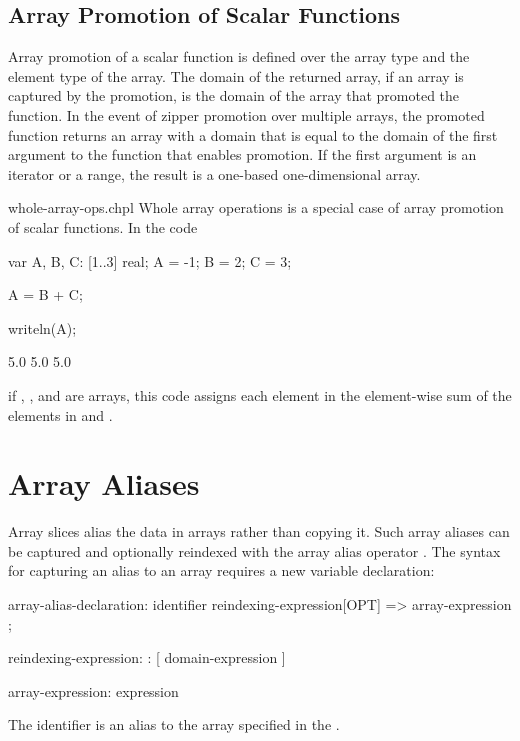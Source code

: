\subsection{Array Promotion of Scalar Functions}
\label{Array_Promotion_of_Scalar_Functions}

Array promotion of a scalar function is defined over the array type
and the element type of the array.  The domain of the returned array,
if an array is captured by the promotion, is the domain of the array
that promoted the function.  In the event of zipper promotion over
multiple arrays, the promoted function returns an array with a domain
that is equal to the domain of the first argument to the function that
enables promotion.  If the first argument is an iterator or a range,
the result is a one-based one-dimensional array.

\begin{chapelexample}{whole-array-ops.chpl}
Whole array operations is a special case of array promotion of scalar
functions.  In the code
\begin{chapelpre}
var A, B, C: [1..3] real;
A = -1;
B = 2;
C = 3;
\end{chapelpre}
\begin{chapel}
A = B + C;
\end{chapel}
\begin{chapelpost}
writeln(A);
\end{chapelpost}
\begin{chapeloutput}
5.0 5.0 5.0
\end{chapeloutput}
if , , and  are arrays, this code assigns each
element in  the element-wise sum of the elements in 
and .
\end{chapelexample}

%
%


\section{Array Aliases}
\label{Array_Aliases}

Array slices alias the data in arrays rather than copying it.  Such
array aliases can be captured and optionally reindexed with the array
alias operator \chpl{=>}.  The syntax for capturing an alias to an
array requires a new variable declaration:
\begin{syntax}
array-alias-declaration:
  identifier reindexing-expression[OPT] => array-expression ;

reindexing-expression:
  : [ domain-expression ]

array-expression:
  expression
\end{syntax}
The identifier is an alias to the array specified in
the .

